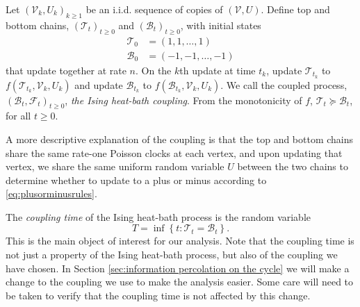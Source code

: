 
	
	Let $(\mathscr{V}_k, U_k)_{k \geq 1}$ be an i.i.d. sequence of copies of $(\mathscr{V}, U)$. Define top and bottom chains, $(\mathscr{T}_t)_{t\geq0}$ and $(\mathscr{B}_t)_{t\geq0}$, with initial states
	\begin{align}
		\mathscr{T}_0 &= (1, 1, \dots, 1)\\
		\mathscr{B}_0 &= (-1, -1, \dots, -1)
	\end{align}
	that update together at rate $n$. On the $k$th update at time $t_k$, update $\mathscr{T}_{t_k}$ to $f(\mathscr{T}_{t_k}, \mathscr{V}_k, U_k)$ and update $\mathscr{B}_{t_k}$ to $f(\mathscr{B}_{t_k}, \mathscr{V}_k, U_k)$.
	We call the coupled process, $(\mathscr{B}_t, \mathscr{F}_t)_{t\geq0}$, \emph{the Ising heat-bath coupling}. From the monotonicity of $f$, $\mathscr{T}_t \succeq \mathscr{B}_t$, for all $t \geq 0$.

	A more descriptive explanation of the coupling is that the top and bottom chains share the same rate-one Poisson clocks at each vertex, and upon updating that vertex, we share the same uniform random variable $U$ between the two chains to determine whether to update to a plus or minus according to \eqref{eq:plusorminusrules}.

	The \emph{coupling time} of the Ising heat-bath process is the random variable
	\begin{equation}
		T = \inf \left\{t : \mathscr{T}_t = \mathscr{B}_t \right\}.	
	\end{equation}
	This is the main object of interest for our analysis. Note that the coupling time is not just a property of the Ising heat-bath process, but also of the coupling we have chosen. In Section \ref{sec:information percolation on the cycle} we will make a change to the coupling we use to make the analysis easier. Some care will need to be taken to verify that the coupling time is not affected by this change.


